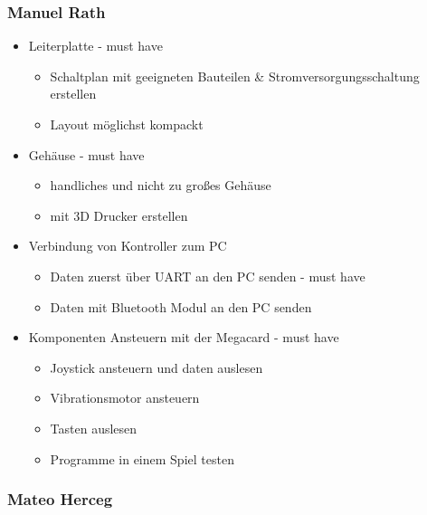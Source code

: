 \hypertarget{manuel-rath}{%
\subsubsection{Manuel Rath }\label{manuel-rath}}

\begin{itemize}
\item
  Leiterplatte - must have

  \begin{itemize}
  \item
    Schaltplan mit geeigneten Bauteilen \& Stromversorgungsschaltung
    erstellen
  \item
    Layout möglichst kompackt
  \end{itemize}
\item
  Gehäuse - must have

  \begin{itemize}
  \item
    handliches und nicht zu großes Gehäuse 
  \item
    mit 3D Drucker erstellen 
  \end{itemize}
\item
  Verbindung von Kontroller zum PC

  \begin{itemize}
  \item
    Daten zuerst über UART an den PC senden - must have
  \item
    Daten mit Bluetooth Modul an den PC senden
  \end{itemize}
\item
  Komponenten Ansteuern mit der Megacard - must have

  \begin{itemize}
  \item
    Joystick ansteuern und daten auslesen
  \item
    Vibrationsmotor ansteuern 
  \item
    Tasten auslesen 
  \item
    Programme in einem Spiel testen 
  \end{itemize}
\end{itemize}

\hypertarget{mateo-herceg}{%
\subsubsection{Mateo Herceg}\label{mateo-herceg}}

